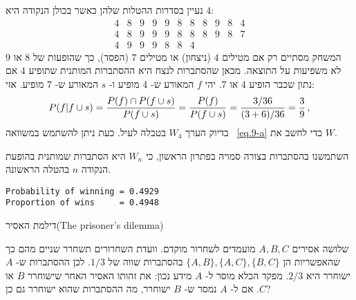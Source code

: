 

נעיין בסדרות ההטלות שלהן כאשר בכולן הנקודה היא
$4$:
\[
\begin{array}{rrrrrrrrrrr}
4 & 8 & 9 & 9 & 9 & 8 & 8 & 8 & 9 & 8 & 4\\
4 & 8 & 9 & 9 & 9 & 8 & 8 & 8 & 9 & 8 & 7\\
4 & 9 & 9 & 9 & 8 & 8 & 4
\end{array}
\]
המשחק מסתיים רק אם מטילים 
$4$
(ניצחון) או מטילים
$7$
(הפסד), כך שהופעות של 
$8$
או
$9$
לא משפיעות על התוצאה. מכאן שהסתברות לנצח היא ההסתברות המותנית שתופיע
$4$
אם נתון שכבר הופיע
$4$
או
$7$. 
יהי 
$f$
המאורע ש-%
$4$
מופיע ו-%
$s$
המאורע ש-%
$7$
מופיע. אזי:
\[
P(f|f\cup s) = \displaystyle\frac{P(f)\cap P(f\cup s)}{P(f\cup s)}=\displaystyle\frac{P(f)}{P(f\cup s)}=\displaystyle\frac{3/36}{(3+6)/36}=\displaystyle\frac{3}{9}\,,
\]
בדיוק הערך
$W_4$
בטבלה לעיל. כעת ניתן להשתמש במשוואה%
~\ref{eq.9-a}
כדי לחשב את
$W$.

השתמשנו בהסתברות בצורה סמויה בפתרון הראשון, כי 
$W_n$
היא הסתברות שמותנית בהופעת הנקודה
$n$
בהטלה הראשונה.

\sml{}
\begin{verbatim}
Probability of winning = 0.4929
Proportion of wins     = 0.4948
\end{verbatim}








\begin{prob}{דילמת האסיר}{}{(The prisoner's dilemma)}

שלושה אסירים 
$A,B,C$
מועמדים לשחרור מוקדם. וועדת השחרורים תשחרר שניים מהם כך שהאפשריות הן
$\{A,B\}, \{A,C\}, \{B,C\}$
בהסתברות שווה של
$1/3$.
לכן ההסתברות ש-%
$A$
ישוחרר היא
$2/3$.
מפקד הכלא מוסר ל-%
$A$
מידע נכון: את זהותו האסיר האחר שישוחרר 
$B$
או
$C$.
אם ל-%
$A$
נמסר ש-%
$B$
ישוחרר, מה ההסתברות שהוא ישוחרר גם כן?
\end{prob}

